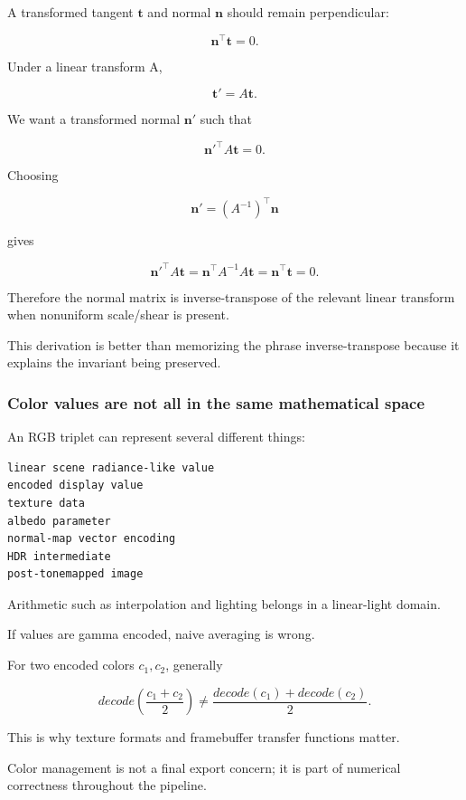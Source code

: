 A transformed tangent \(\mathbf t\) and normal \(\mathbf n\) should remain perpendicular:

\[
\mathbf n^\top\mathbf t=0.
\]

Under a linear transform A,

\[
\mathbf t'=A\mathbf t.
\]

We want a transformed normal \(\mathbf n'\) such that

\[
{\mathbf n'}^\top A\mathbf t=0.
\]

Choosing

\[
\mathbf n'=(A^{-1})^\top\mathbf n
\]

gives

\[
{\mathbf n'}^\top A\mathbf t
=
\mathbf n^\top A^{-1}A\mathbf t
=
\mathbf n^\top\mathbf t
=
0.
\]

Therefore the normal matrix is inverse-transpose of the relevant linear transform when nonuniform scale/shear is present.

This derivation is better than memorizing the phrase inverse-transpose because it explains the invariant being preserved.

\subsubsection{Color values are not all in the same mathematical space}\label{03-visual-computing-i-ch001-color-values-are-not-all-in-the-same-mathematical-space}

An RGB triplet can represent several different things:

\begin{verbatim}
linear scene radiance-like value
encoded display value
texture data
albedo parameter
normal-map vector encoding
HDR intermediate
post-tonemapped image
\end{verbatim}

Arithmetic such as interpolation and lighting belongs in a linear-light domain.

If values are gamma encoded, naive averaging is wrong.

For two encoded colors \(c_1,c_2\), generally

\[
decode\left(
\frac{c_1+c_2}{2}
\right)
\neq
\frac{decode(c_1)+decode(c_2)}{2}.
\]

This is why texture formats and framebuffer transfer functions matter.

Color management is not a final export concern; it is part of numerical correctness throughout the pipeline.

